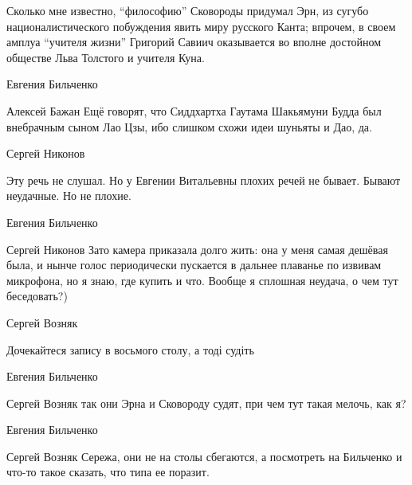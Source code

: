 Сколько мне известно, \enquote{философию} Сковороды придумал Эрн, из сугубо
националистического побуждения явить миру русского Канта; впрочем, в своем
амплуа \enquote{учителя жизни} Григорий Савиич оказывается во вполне достойном обществе
Льва Толстого и учителя Куна.

Евгения Бильченко

Алексей Бажан Ещё говорят, что Сиддхартха Гаутама Шакьямуни Будда был
внебрачным сыном Лао Цзы, ибо слишком схожи идеи шуньяты и Дао, да.

Сергей Никонов

Эту речь не слушал. Но у Евгении Витальевны плохих речей не бывает. Бывают
неудачные. Но не плохие.

Евгения Бильченко

Сергей Никонов Зато камера приказала долго жить: она у меня самая дешёвая была,
и нынче голос периодически пускается в дальнее плаванье по извивам микрофона,
но я знаю, где купить и что. Вообще я сплошная неудача, о чем тут беседовать?)

Сергей Возняк

Дочекайтеся запису в восьмого столу, а тоді судіть

Евгения Бильченко

Сергей Возняк так они Эрна и Сковороду судят, при чем тут такая мелочь, как я?

Евгения Бильченко

Сергей Возняк Сережа, они не на столы сбегаются, а посмотреть на Бильченко и
что-то такое сказать, что типа ее поразит.
